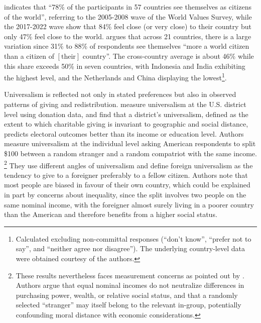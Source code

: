 \documentclass[11pt,a4paper]{article}
\begin{document}
\citet{bayram_2015} indicates that ``78\% of the participants in 57 countries see themselves as citizens of the world'', referring to the 2005-2008 wave of the World Values Survey, while the 2017-2022 wave %
show that 84\% feel close (or very close) to their country but only 47\% feel close to the world. 
\citet{nation_2024} argues that across 21 countries, there is a large variation since 31\% to 88\% of respondents see themselves ``more a world citizen than a citizen of $\left[ \text{their} \right]$ country''. The cross-country average is about 46\% while this share exceeds 50\% in seven countries, with Indonesia and India exhibiting the highest level, and the Netherlands and China displaying the lowest\footnote{Calculated excluding non-committal responses (``don't know'', ``prefer not to say'', and ``neither agree nor disagree''). The underlying country-level data were obtained courtesy of the authors.}. %

Universalism is reflected not only in stated preferences but also in observed patterns of giving and redistribution. \citet{enke_universalism_2024} measure universalism at the U.S. district level using donation data, and find that a district's universalism, defined as the extent to which charitable giving is invariant to geographic and social distance, predicts electoral outcomes better than its income or education level. Authors %
measure universalism at the individual level asking American respondents to split \$100 between a random stranger and a random compatriot %
with the same income.%
\footnote{These results nevertheless faces measurement concerns as pointed out by  \citet{boyer-kassem_how_2026}. Authors argue that equal nominal incomes do not neutralize differences in purchasing power, wealth, or relative social status, and that a randomly selected ``stranger'' may itself belong to the relevant in-group, potentially confounding moral distance with economic considerations.} %
They use different angles of universalism and define foreign universalism as the tendency to give to a foreigner preferably to a fellow citizen. Authors note that most %
people are biased in favour of their own country, which could be explained in part by concerns about inequality, since the split involves two people on the same nominal income, with the foreigner almost surely living in a poorer country than the American and therefore benefits from a higher social status. 
\end{document}
